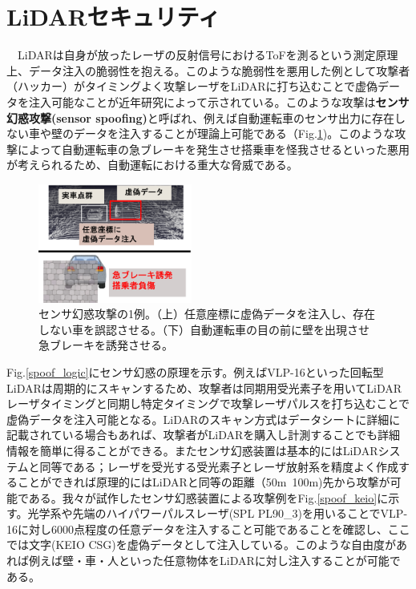 \documentclass[twocolumn, 11pt, a4j]{article}
\begin{document}
\section{LiDARセキュリティ}
　LiDARは自身が放ったレーザの反射信号におけるToFを測るという測定原理上、データ注入の脆弱性を抱える。このような脆弱性を悪用した例として攻撃者（ハッカー）がタイミングよく攻撃レーザをLiDARに打ち込むことで虚偽データを注入可能なことが近年研究によって示されている\cite{sato2022poster,cao2019adversarial,hallyburton2022security,illusion, cao2022you}。このような攻撃は\textbf{センサ幻惑攻撃(sensor spoofing)}と呼ばれ、例えば自動運転車のセンサ出力に存在しない車や壁のデータを注入することが理論上可能である（Fig.\ref{spoof_example})。このような攻撃によって自動運転車の急ブレーキを発生させ搭乗車を怪我させるといった悪用が考えられるため、自動運転における重大な脅威である。

 \begin{figure}[!t]
\centering
 \includegraphics[width=0.45\textwidth]{figs/spoof0.png}
  \caption{センサ幻惑攻撃の1例。（上）任意座標に虚偽データを注入し、存在しない車を誤認させる。（下）自動運転車の目の前に壁を出現させ急ブレーキを誘発させる。}
\label{spoof_example}
\end{figure}
 
Fig.\ref{spoof_logic}にセンサ幻惑の原理を示す。例えばVLP-16といった回転型LiDARは周期的にスキャンするため、攻撃者は同期用受光素子を用いてLiDARレーザタイミングと同期し特定タイミングで攻撃レーザパルスを打ち込むことで虚偽データを注入可能となる。LiDARのスキャン方式はデータシートに詳細に記載されている場合もあれば、攻撃者がLiDARを購入し計測することでも詳細情報を簡単に得ることができる。またセンサ幻惑装置は基本的にはLiDARシステムと同等である；レーザを受光する受光素子とレーザ放射系を精度よく作成することができれば原理的にはLiDARと同等の距離（50m~100m)先から攻撃が可能である。我々が試作したセンサ幻惑装置による攻撃例をFig.\ref{spoof_keio}に示す\cite{sato2022poster}。光学系や先端のハイパワーパルスレーザ(SPL PL90\_3)を用いることでVLP-16に対し6000点程度の任意データを注入すること可能であることを確認し、ここでは文字(KEIO CSG)を虚偽データとして注入している。このような自由度があれば例えば壁・車・人といった任意物体をLiDARに対し注入することが可能である。
\end{document}
